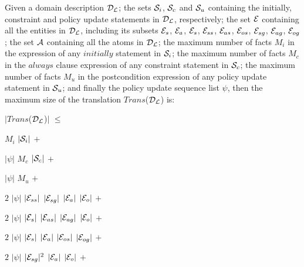 \documentclass[glov2,twocolumn,final]{svjour2}
\newenvironment{vtheorem}[1]
  {\begin{theorem}[#1]\hspace{0.1em}}
  {\end{theorem}}
\newenvironment{vquote}
  {\begin{list}{}{\leftmargin 1em}\item[]}
  {\end{list}}
\begin{document}
        \begin{vtheorem}{Translation Size}
          \label{the-size}
          Given a domain description ${\cal D_{L}}$; the sets ${\cal S}_{i}$,
          ${\cal S}_{c}$ and ${\cal S}_{u}$ containing the initially,
          constraint and policy update statements in ${\cal D_{L}}$,
          respectively; the set ${\cal E}$ containing all the entities in
          ${\cal D_{L}}$, including its subsets ${\cal E}_{s}$, ${\cal E}_{a}$,
          ${\cal E}_{s}$, ${\cal E}_{ss}$, ${\cal E}_{as}$, ${\cal E}_{os}$,
          ${\cal E}_{sg}$, ${\cal E}_{ag}$, ${\cal E}_{og}$; the set ${\cal A}$
          containing all the atoms in ${\cal D_{L}}$; the maximum number
          of facts $M_{i}$ in the expression of any $initially$ statement in
          ${\cal S}_{i}$; the maximum number of facts $M_{c}$ in the $always$
          clause expression of any constraint statement in ${\cal S}_{c}$;
          the maximum number of facts $M_{u}$ in the postcondition expression
          of any policy update statement in ${\cal S}_{u}$; and finally the
          policy update sequence list $\psi$, then the maximum size of the
          translation $Trans$(${\cal D_{L}}$) is:

         \begin{vquote}
            $|$$Trans$(${\cal D_{L}}$)$|$ $\leq$

            \hspace{1em}
            $M_{i}$ $|{\cal S}_{i}|$ $+$

            \hspace{1em}
            $|\psi|$ $M_{c}$ $|{\cal S}_{c}|$ $+$

            \hspace{1em}
            $|\psi|$ $M_{u}$ $+$

            \hspace{1em}
            $2$ $|\psi|$ $|{\cal E}_{ss}|$ $|{\cal E}_{sg}|$ $|{\cal E}_{a}|$ $|{\cal E}_{o}|$ $+$

            \hspace{1em}
            $2$ $|\psi|$ $|{\cal E}_{s}|$ $|{\cal E}_{as}|$ $|{\cal E}_{ag}|$ $|{\cal E}_{o}|$ $+$

            \hspace{1em}
            $2$ $|\psi|$ $|{\cal E}_{s}|$ $|{\cal E}_{a}|$ $|{\cal E}_{os}|$ $|{\cal E}_{og}|$ $+$

            \hspace{1em}
            $2$ $|\psi|$ $|{\cal E}_{sg}|^{2}$ $|{\cal E}_{a}|$ $|{\cal E}_{o}|$ $+$


\end{vquote}
\end{vtheorem}
\end{document}
